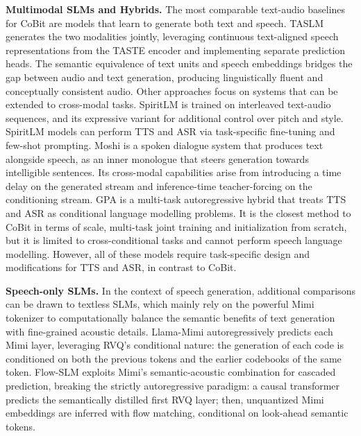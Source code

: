 \textbf{Multimodal SLMs and Hybrids.} The most comparable text-audio baselines for CoBit are models that learn to generate both text and speech. TASLM \citep{audio:taste} generates the two modalities jointly, leveraging continuous text-aligned speech representations from the TASTE encoder and implementing separate prediction heads. The semantic equivalence of text units and speech embeddings bridges the gap between audio and text generation, producing linguistically fluent and conceptually consistent audio. Other approaches focus on systems that can be extended to cross-modal tasks. SpiritLM \citep{audio:spirit-lm} is trained on interleaved text-audio sequences, and its expressive variant for additional control over pitch and style. SpiritLM models can perform TTS and ASR via task-specific fine-tuning and few-shot prompting. Moshi \citep{audio:moshi} is a spoken dialogue system that produces text alongside speech, as an inner monologue that steers generation towards intelligible sentences. Its cross-modal capabilities arise from introducing a time delay on the generated stream and inference-time teacher-forcing on the conditioning stream. GPA \citep{audio:gpa} is a multi-task autoregressive hybrid that treats TTS and ASR as conditional language modelling problems. It is the closest method to CoBit in terms of scale, multi-task joint training and initialization from scratch, but it is limited to cross-conditional tasks and cannot perform speech language modelling. However, all of these models require task-specific design and modifications for TTS and ASR, in contrast to CoBit.

\textbf{Speech-only SLMs.} In the context of speech generation, additional comparisons can be drawn to textless SLMs, which mainly rely on the powerful Mimi tokenizer to computationally balance the semantic benefits of text generation with fine-grained acoustic details. Llama-Mimi \citep{audio:llama-mimi} autoregressively predicts each Mimi layer, leveraging RVQ's conditional nature: the generation of each code is conditioned on both the previous tokens and the earlier codebooks of the same token. Flow-SLM \citep{audio:flow-slm} exploits Mimi's semantic-acoustic combination for cascaded prediction, breaking the strictly autoregressive paradigm: a causal transformer predicts the semantically distilled first RVQ layer; then, unquantized Mimi embeddings are inferred with flow matching, conditional on look-ahead semantic tokens.

